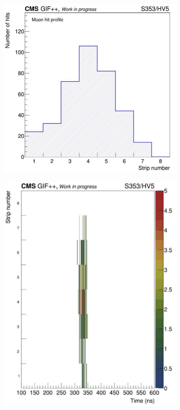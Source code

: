 	\begin{figure}[H]
		\begin{subfigure}{0.5\linewidth}
		    \centering
			\includegraphics[width = \linewidth]{fig/chapt6/iRPC-CMS_FEB-HitProfile.png}
			\caption{\label{fig:iRPC_CMS_Profiles:A}}
		\end{subfigure}
		\begin{subfigure}{0.5\linewidth}
		    \centering
			\includegraphics[width = \linewidth]{fig/chapt6/iRPC-CMS_FEB-TimeProfile.png}

\end{subfigure}
\end{figure}
